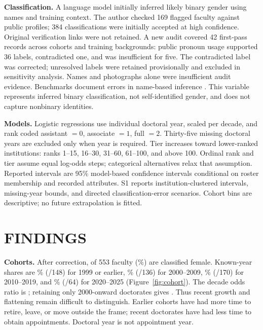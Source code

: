 \documentclass[11pt]{article}
\begin{document}
\textbf{Classification.} A language model initially inferred likely binary gender using names and training context. The author checked 169 flagged faculty against public profiles; 384 classifications were initially accepted at high confidence. Original verification links were not retained. A new audit covered 42 first-pass records across cohorts and training backgrounds: public pronoun usage supported 36 labels, contradicted one, and was insufficient for five. The contradicted label was corrected; unresolved labels were retained provisionally and excluded in sensitivity analysis. Names and photographs alone were insufficient audit evidence. Benchmarks document errors in name-based inference \citep{santamaria2018}. This variable represents inferred binary classification, not self-identified gender, and does not capture nonbinary identities.

\textbf{Models.} Logistic regressions use individual doctoral year, scaled per decade, and rank coded assistant $=0$, associate $=1$, full $=2$. Thirty-five missing doctoral years are excluded only when year is required. Tier increases toward lower-ranked institutions: ranks 1--15, 16--30, 31--60, 61--100, and above 100. Ordinal rank and tier assume equal log-odds steps; categorical alternatives relax that assumption. Reported intervals are 95\% model-based confidence intervals conditional on roster membership and recorded attributes. S1 reports institution-clustered intervals, missing-year bounds, and directed classification-error scenarios. Cohort bins are descriptive; no future extrapolation is fitted.

\section*{FINDINGS}
\textbf{Cohorts.} After correction, \FemaleN{} of 553 faculty (\FemaleShare\%) are classified female. Known-year shares are \CohortOneFemaleShare\% (\CohortOneFemaleN/148) for 1999 or earlier, \CohortTwoFemaleShare\% (\CohortTwoFemaleN/136) for 2000--2009, \CohortThreeFemaleShare\% (\CohortThreeFemaleN/170) for 2010--2019, and \CohortFourFemaleShare\% (\CohortFourFemaleN/64) for 2020--2025 (Figure~\ref{fig:cohort}). The decade odds ratio is \CohortOR; retaining only 2000-onward doctorates gives \RecentOR. Thus recent growth and flattening remain difficult to distinguish. Earlier cohorts have had more time to retire, leave, or move outside the frame; recent doctorates have had less time to obtain appointments. Doctoral year is not appointment year.
\end{document}

